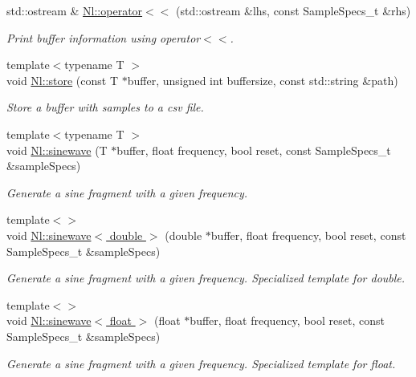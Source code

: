 \begin{DoxyCompactItemize}
\item 
std\+::ostream \& \hyperlink{group__Tools_gabee48f343c56a50d1a2175bc2ba92e82}{Nl\+::operator$<$$<$} (std\+::ostream \&lhs, const Sample\+Specs\+\_\+t \&rhs)
\begin{DoxyCompactList}\small\item\em Print buffer information using operator$<$$<$. \end{DoxyCompactList}\item 
{\footnotesize template$<$typename T $>$ }\\void \hyperlink{group__Tools_gadb18f37b41d4edd77ff13d13f0311e77}{Nl\+::store} (const T $\ast$buffer, unsigned int buffersize, const std\+::string \&path)
\begin{DoxyCompactList}\small\item\em Store a buffer with samples to a csv file. \end{DoxyCompactList}\item 
{\footnotesize template$<$typename T $>$ }\\void \hyperlink{group__Tools_gab946257fcff414a645ead1b096cddb78}{Nl\+::sinewave} (T $\ast$buffer, float frequency, bool reset, const Sample\+Specs\+\_\+t \&sample\+Specs)
\begin{DoxyCompactList}\small\item\em Generate a sine fragment with a given frequency. \end{DoxyCompactList}\item 
{\footnotesize template$<$$>$ }\\void \hyperlink{group__Tools_ga0d9998a7bed5d14bbd7435642a4301a6}{Nl\+::sinewave$<$ double $>$} (double $\ast$buffer, float frequency, bool reset, const Sample\+Specs\+\_\+t \&sample\+Specs)
\begin{DoxyCompactList}\small\item\em Generate a sine fragment with a given frequency. Specialized template for double. \end{DoxyCompactList}\item 
{\footnotesize template$<$$>$ }\\void \hyperlink{group__Tools_ga484b1c4e2bb92cc85595d2425af0db32}{Nl\+::sinewave$<$ float $>$} (float $\ast$buffer, float frequency, bool reset, const Sample\+Specs\+\_\+t \&sample\+Specs)
\begin{DoxyCompactList}\small\item\em Generate a sine fragment with a given frequency. Specialized template for float. \end{DoxyCompactList}\item 

\end{DoxyCompactItemize}
